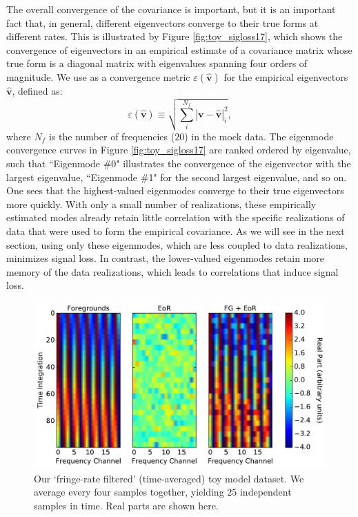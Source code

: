 \documentclass[preprint2,numberedappendix,tighten]{aastex6}  %
\newcommand{\acl}[1]{{\color{red} \textbf{[ACL:  #1]}}}
\begin{document}
The overall convergence of the covariance is important, but it is an important fact that, in general, different eigenvectors converge to their true forms at different rates. This is illustrated by Figure \ref{fig:toy_sigloss17}, which shows the convergence of eigenvectors in an empirical estimate of a covariance matrix whose true form is a diagonal matrix with eigenvalues spanning four orders of magnitude. We use as a convergence metric $\varepsilon(\widehat{\textbf{v}})$ for the empirical eigenvectors $\widehat{\textbf{v}}$, defined as:
\begin{equation}
\label{eq:converge_eig}
\varepsilon (\widehat{\textbf{v}}) \equiv \sqrt{\sum_{i}^{N_{f}}|\textbf{v}-\widehat{\textbf{v}}|_{i}^2},
\end{equation}
where $N_{f}$ is the number of frequencies ($20$) in the mock data. The eigenmode convergence curves  in Figure \ref{fig:toy_sigloss17} are ranked ordered by eigenvalue, such that ``Eigenmode \#0" illustrates the convergence of the eigenvector with the largest eigenvalue, ``Eigenmode \#1" for the second largest eigenvalue, and so on. One sees that the highest-valued eigenmodes converge to their true eigenvectors more quickly. With only a small number of realizations, these empirically estimated modes already retain little correlation with the specific realizations of data that were used to form the empirical covariance. As we will see in the next section, using only these eigenmodes, which are less coupled to data realizations, minimizes signal loss. In contrast, the lower-valued eigenmodes retain more memory of the data realizations, which leads to correlations that induce signal loss. 

\begin{figure}
	\centering
	\includegraphics[width=\columnwidth]{plots/toy_sigloss5.pdf}
	\caption{Our `fringe-rate filtered' (time-averaged) toy model dataset. We average every four samples together, 
yielding $25$ independent samples in time. Real parts are shown here.}
	\label{fig:toy_sigloss5}
\end{figure}
\end{document}
